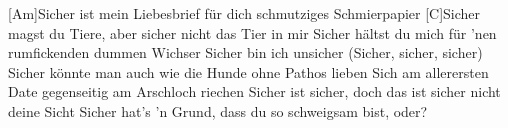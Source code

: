 \begin{guitar}
	[Am]Sicher ist mein Liebesbrief für dich schmutziges Schmierpapier
	[C]Sicher magst du Tiere, aber sicher nicht das Tier in mir
	Sicher hältst du mich für 'nen rumfickenden dummen Wichser
	Sicher bin ich unsicher (Sicher, sicher, sicher)
	Sicher könnte man auch wie die Hunde ohne Pathos lieben
	Sich am allerersten Date gegenseitig am Arschloch riechen
	Sicher ist sicher, doch das ist sicher nicht deine Sicht
	Sicher hat's 'n Grund, dass du so schweigsam bist, oder?
	
	  
\end{guitar}